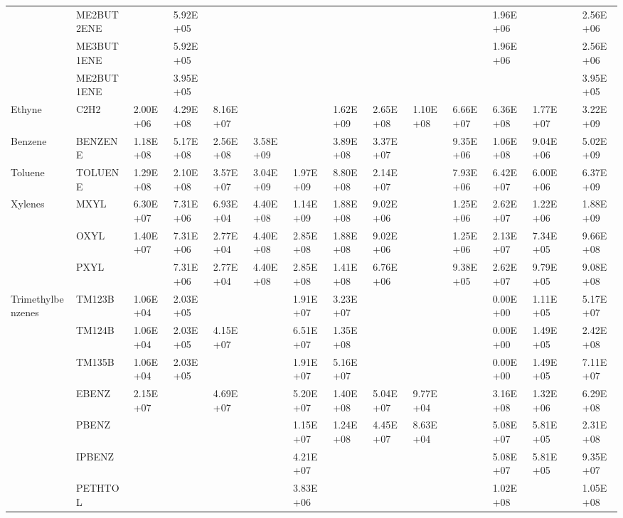 \begin{longtable}{lllllllllllllll}
	 & ME2BUT2ENE &  & 5.92E+05 &  &  &  &  &  &  &  & 1.96E+06 &  &  & 2.56E+06 \\
	 & ME3BUT1ENE &  & 5.92E+05 &  &  &  &  &  &  &  & 1.96E+06 &  &  & 2.56E+06 \\
	 & ME2BUT1ENE &  & 3.95E+05 &  &  &  &  &  &  &  &  &  &  & 3.95E+05 \\
	\hline Ethyne & C2H2 & 2.00E+06 & 4.29E+08 & 8.16E+07 &  &  & 1.62E+09 & 2.65E+08 & 1.10E+08 & 6.66E+07 & 6.36E+08 & 1.77E+07 &  & 3.22E+09 \\ \hline
	Benzene & BENZENE & 1.18E+08 & 5.17E+08 & 2.56E+08 & 3.58E+09 &  & 3.89E+08 & 3.37E+07 &  & 9.35E+06 & 1.06E+08 & 9.04E+06 &  & 5.02E+09 \\
	\hline Toluene & TOLUENE & 1.29E+08 & 2.10E+08 & 3.57E+07 & 3.04E+09 & 1.97E+09 & 8.80E+08 & 2.14E+07 &  & 7.93E+06 & 6.42E+07 & 6.00E+06 &  & 6.37E+09 \\ \hline
	\multirow{3}{*}{Xylenes} & MXYL & 6.30E+07 & 7.31E+06 & 6.93E+04 & 4.40E+08 & 1.14E+09 & 1.88E+08 & 9.02E+06 &  & 1.25E+06 & 2.62E+07 & 1.22E+06 &  & 1.88E+09 \\
	 & OXYL & 1.40E+07 & 7.31E+06 & 2.77E+04 & 4.40E+08 & 2.85E+08 & 1.88E+08 & 9.02E+06 &  & 1.25E+06 & 2.13E+07 & 7.34E+05 &  & 9.66E+08 \\
	 & PXYL &  & 7.31E+06 & 2.77E+04 & 4.40E+08 & 2.85E+08 & 1.41E+08 & 6.76E+06 &  & 9.38E+05 & 2.62E+07 & 9.79E+05 &  & 9.08E+08 \\
	\hline \multirow{3}{*}{Trimethylbenzenes} & TM123B & 1.06E+04 & 2.03E+05 &  &  & 1.91E+07 & 3.23E+07 &  &  &  & 0.00E+00 & 1.11E+05 &  & 5.17E+07 \\
	 & TM124B & 1.06E+04 & 2.03E+05 & 4.15E+07 &  & 6.51E+07 & 1.35E+08 &  &  &  & 0.00E+00 & 1.49E+05 &  & 2.42E+08 \\
	 & TM135B & 1.06E+04 & 2.03E+05 &  &  & 1.91E+07 & 5.16E+07 &  &  &  & 0.00E+00 & 1.49E+05 &  & 7.11E+07 \\
	\hline \parbox[t]{2mm}{} & EBENZ & 2.15E+07 &  & 4.69E+07 &  & 5.20E+07 & 1.40E+08 & 5.04E+07 & 9.77E+04 &  & 3.16E+08 & 1.32E+06 &  & 6.29E+08 \\
	 & PBENZ &  &  &  &  & 1.15E+07 & 1.24E+08 & 4.45E+07 & 8.63E+04 &  & 5.08E+07 & 5.81E+05 &  & 2.31E+08 \\
	 & IPBENZ &  &  &  &  & 4.21E+07 &  &  &  &  & 5.08E+07 & 5.81E+05 &  & 9.35E+07 \\
	 & PETHTOL &  &  &  &  & 3.83E+06 &  &  &  &  & 1.02E+08 &  &  & 1.05E+08 \\

\end{longtable}

